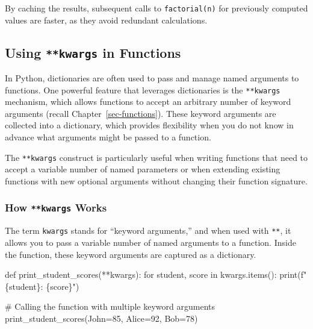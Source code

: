 \documentclass[
  letterpaper,
  DIV=11,
  numbers=noendperiod]{scrreprt}
\newenvironment{Shaded}{\begin{snugshade}}{\end{snugshade}}
\newcommand{\BuiltInTok}[1]{\textcolor[rgb]{0.00,0.23,0.31}{#1}}
\newcommand{\CommentTok}[1]{\textcolor[rgb]{0.37,0.37,0.37}{#1}}
\newcommand{\ControlFlowTok}[1]{\textcolor[rgb]{0.00,0.23,0.31}{#1}}
\newcommand{\DecValTok}[1]{\textcolor[rgb]{0.68,0.00,0.00}{#1}}
\newcommand{\KeywordTok}[1]{\textcolor[rgb]{0.00,0.23,0.31}{#1}}
\newcommand{\NormalTok}[1]{\textcolor[rgb]{0.00,0.23,0.31}{#1}}
\newcommand{\OperatorTok}[1]{\textcolor[rgb]{0.37,0.37,0.37}{#1}}
\newcommand{\SpecialCharTok}[1]{\textcolor[rgb]{0.37,0.37,0.37}{#1}}
\newcommand{\SpecialStringTok}[1]{\textcolor[rgb]{0.13,0.47,0.30}{#1}}
\begin{document}
By caching the results, subsequent calls to \texttt{factorial(n)} for
previously computed values are faster, as they avoid redundant
calculations.

\hypertarget{using-kwargs-in-functions}{%
\subsection{\texorpdfstring{Using \texttt{**kwargs} in
Functions}{Using **kwargs in Functions}}\label{using-kwargs-in-functions}}

In Python, dictionaries are often used to pass and manage named
arguments to functions. One powerful feature that leverages dictionaries
is the \texttt{**kwargs} mechanism, which allows functions to accept an
arbitrary number of keyword arguments (recall
Chapter~\ref{sec-functions}). These keyword arguments are collected into
a dictionary, which provides flexibility when you do not know in advance
what arguments might be passed to a function.

The \texttt{**kwargs} construct is particularly useful when writing
functions that need to accept a variable number of named parameters or
when extending existing functions with new optional arguments without
changing their function signature.

\hypertarget{how-kwargs-works}{%
\subsubsection{\texorpdfstring{How \texttt{**kwargs}
Works}{How **kwargs Works}}\label{how-kwargs-works}}

The term \texttt{kwargs} stands for ``keyword arguments,'' and when used
with \texttt{**}, it allows you to pass a variable number of named
arguments to a function. Inside the function, these keyword arguments
are captured as a dictionary.

\begin{Shaded}
\begin{Highlighting}[]
\KeywordTok{def}\NormalTok{ print\_student\_scores(}\OperatorTok{**}\NormalTok{kwargs):}
    \ControlFlowTok{for}\NormalTok{ student, score }\KeywordTok{in}\NormalTok{ kwargs.items():}
        \BuiltInTok{print}\NormalTok{(}\SpecialStringTok{f"}\SpecialCharTok{\{}\NormalTok{student}\SpecialCharTok{\}}\SpecialStringTok{: }\SpecialCharTok{\{}\NormalTok{score}\SpecialCharTok{\}}\SpecialStringTok{"}\NormalTok{)}

\CommentTok{\# Calling the function with multiple keyword arguments}
\NormalTok{print\_student\_scores(John}\OperatorTok{=}\DecValTok{85}\NormalTok{, Alice}\OperatorTok{=}\DecValTok{92}\NormalTok{, Bob}\OperatorTok{=}\DecValTok{78}\NormalTok{)}
\end{Highlighting}
\end{Shaded}
\end{document}
